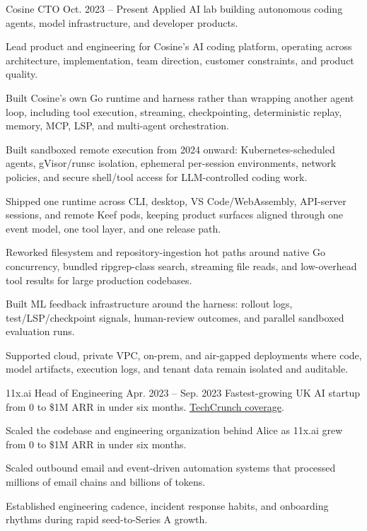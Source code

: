 
\ResumeJob
  {Cosine}
  {CTO}
  {Oct. 2023 -- Present}
  {Applied AI lab building autonomous coding agents, model infrastructure, and developer products.}
\begin{ResumeList}
  \item Lead product and engineering for Cosine's AI coding platform, operating across architecture, implementation, team direction, customer constraints, and product quality.
  \item Built Cosine's own Go runtime and harness rather than wrapping another agent loop, including tool execution, streaming, checkpointing, deterministic replay, memory, MCP, LSP, and multi-agent orchestration.
  \item Built sandboxed remote execution from 2024 onward: Kubernetes-scheduled agents, gVisor/runsc isolation, ephemeral per-session environments, network policies, and secure shell/tool access for LLM-controlled coding work.
  \item Shipped one runtime across CLI, desktop, VS Code/WebAssembly, API-server sessions, and remote Keef pods, keeping product surfaces aligned through one event model, one tool layer, and one release path.
  \item Reworked filesystem and repository-ingestion hot paths around native Go concurrency, bundled ripgrep-class search, streaming file reads, and low-overhead tool results for large production codebases.
  \item Built ML feedback infrastructure around the harness: rollout logs, test/LSP/checkpoint signals, human-review outcomes, and parallel sandboxed evaluation runs.
  \item Supported cloud, private VPC, on-prem, and air-gapped deployments where code, model artifacts, execution logs, and tenant data remain isolated and auditable.
\end{ResumeList}

\ResumeJob
  {11x.ai}
  {Head of Engineering}
  {Apr. 2023 -- Sep. 2023}
  {Fastest-growing UK AI startup from 0 to \$1M ARR in under six months. \href{https://techcrunch.com/2023/08/11/11xai-closes-2-million-pre-seed-to-create-autonomous-ai-workers/}{TechCrunch coverage}.}
\begin{ResumeList}
  \item Scaled the codebase and engineering organization behind Alice as 11x.ai grew from 0 to \$1M ARR in under six months.
  \item Scaled outbound email and event-driven automation systems that processed millions of email chains and billions of tokens.
  \item Established engineering cadence, incident response habits, and onboarding rhythms during rapid seed-to-Series A growth.
\end{ResumeList}

